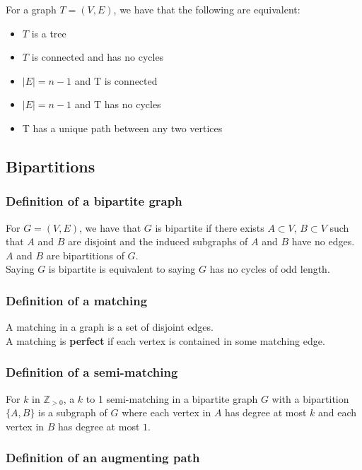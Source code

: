 \documentclass[a4paper, 12pt, twoside]{article}
\begin{document}
For a graph $T = (V, E)$, we have that the following are
equivalent: \begin{itemize}
  \item $T$ is a tree
  \item $T$ is connected and has no cycles
  \item $|E| = n - 1$ and T is connected
  \item $|E| = n - 1$ and T has no cycles
  \item T has a unique path between any two vertices
\end{itemize}

\subsection{Bipartitions}

\subsubsection{Definition of a bipartite graph}

For $G = (V, E)$, we have that $G$ is bipartite if there exists
$A \subset V$, $B \subset V$ such that $A$ and $B$ are disjoint
and the induced subgraphs of $A$ and $B$ have no edges. $A$
and $B$ are bipartitions of $G$.
\\[\baselineskip]
Saying $G$ is bipartite is equivalent to saying $G$ has no
cycles of odd length.
 
\subsubsection{Definition of a matching}

A matching in a graph is a set of disjoint edges.
\\[\baselineskip]
A matching is \textbf{perfect} if each vertex is contained in
some matching edge.

\subsubsection{Definition of a semi-matching}

For $k$ in $\mathbb{Z}_{>0}$, a $k$ to 1 semi-matching in a
bipartite graph $G$ with a bipartition $\{A, B\}$ is a subgraph
of $G$ where each vertex in $A$ has degree at most $k$ and
each vertex in $B$ has degree at most $1$.

\subsubsection{Definition of an augmenting path}
\end{document}
